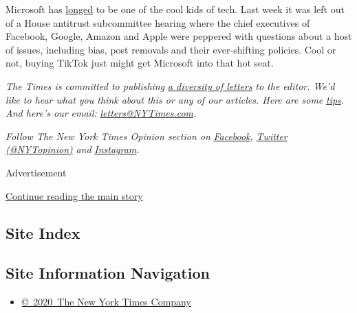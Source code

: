 Microsoft has
\href{https://www.nytimes3xbfgragh.onion/2020/08/03/technology/tiktok-microsoft-tweens.html}{longed}
to be one of the cool kids of tech. Last week it was left out of a House
antitrust subcommittee hearing where the chief executives of Facebook,
Google, Amazon and Apple were peppered with questions about a host of
issues, including bias, post removals and their ever-shifting policies.
Cool or not, buying TikTok just might get Microsoft into that hot seat.

\emph{The Times is committed to publishing}
\href{https://www.nytimes3xbfgragh.onion/2019/01/31/opinion/letters/letters-to-editor-new-york-times-women.html}{\emph{a
diversity of letters}} \emph{to the editor. We'd like to hear what you
think about this or any of our articles. Here are some}
\href{https://help.nytimes3xbfgragh.onion/hc/en-us/articles/115014925288-How-to-submit-a-letter-to-the-editor}{\emph{tips}}\emph{.
And here's our email:}
\href{mailto:letters@NYTimes.com}{\emph{letters@NYTimes.com}}\emph{.}

\emph{Follow The New York Times Opinion section on}
\href{https://www.facebookcorewwwi.onion/nytopinion}{\emph{Facebook}}\emph{,}
\href{http://twitter.com/NYTOpinion}{\emph{Twitter (@NYTopinion)}}
\emph{and}
\href{https://www.instagram.com/nytopinion/}{\emph{Instagram}}\emph{.}

Advertisement

\protect\hyperlink{after-bottom}{Continue reading the main story}

\hypertarget{site-index}{%
\subsection{Site Index}\label{site-index}}

\hypertarget{site-information-navigation}{%
\subsection{Site Information
Navigation}\label{site-information-navigation}}

\begin{itemize}
\tightlist
\item
  \href{https://help.nytimes3xbfgragh.onion/hc/en-us/articles/115014792127-Copyright-notice}{©~2020~The
  New York Times Company}
\end{itemize}

